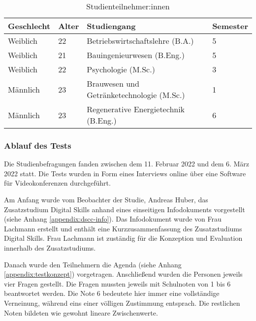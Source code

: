 \begin{table}[H]
\renewcommand*{\arraystretch}{1.6}
\centering
\begin{tabular}{|l|l|l|l|}
\hline
\textbf{Geschlecht} & \textbf{Alter} & \textbf{Studiengang}                      & \textbf{Semester} \\ \hline
Weiblich            & 22             & Betriebswirtschaftslehre (B.A.)           & 5                 \\ \hline
Weiblich            & 21             & Bauingenieurwesen (B.Eng.)                & 5                 \\ \hline
Weiblich            & 22             & Psychologie (M.Sc.)                       & 3                 \\ \hline
Männlich            & 23             & Brauwesen und Getränketechnologie (M.Sc.) & 1                 \\ \hline
Männlich            & 23             & Regenerative Energietechnik (B.Eng.)     & 6                 \\ \hline
\end{tabular}
\caption{Studienteilnehmer:innen}

\label{table:studie-teilnehmende}
\end{table}

\subsubsection{Ablauf des Tests}
Die Studienbefragungen fanden zwischen dem 11. Februar 2022 und dem 6. März 2022
statt. Die Tests wurden in Form eines Interviews online über eine Software für
Videokonferenzen durchgeführt.

Am Anfang wurde vom Beobachter der Studie, Andreas Huber, das Zusatzstudium
Digital Skills anhand eines einseitigen Infodokuments vorgestellt (siehe Anhang
\ref{appendix:dscc-info}). Das Infodokument wurde von Frau Lachmann erstellt und
enthält eine Kurzzusammenfassung des Zusatzstudiums Digital Skills. Frau
Lachmann ist zuständig für die Konzeption und Evaluation innerhalb des
Zusatzstudiums.

Danach wurde den Teilnehmern die Agenda (siehe Anhang
\ref{appendix:testkonzept}) vorgetragen. Anschließend wurden die Personen
jeweils vier Fragen gestellt. Die Fragen mussten jeweils mit Schulnoten
von 1 bis 6 beantwortet werden. Die Note 6 bedeutete hier immer eine
vollständige Verneinung, während eins einer völligen Zustimmung entsprach. Die
restlichen Noten bildeten wie gewohnt lineare Zwischenwerte.

